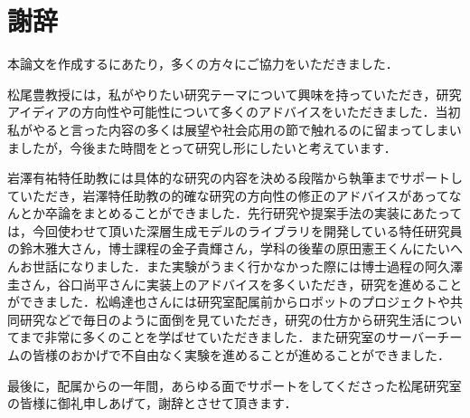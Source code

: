 \chapter*{謝辞}
\label{chap:acknowledgments}
本論文を作成するにあたり，多くの方々にご協力をいただきました．

松尾豊教授には，私がやりたい研究テーマについて興味を持っていただき，研究アイディアの方向性や可能性について多くのアドバイスをいただきました．当初私がやると言った内容の多くは展望や社会応用の節で触れるのに留まってしまいましたが，今後また時間をとって研究し形にしたいと考えています．

岩澤有祐特任助教には具体的な研究の内容を決める段階から執筆までサポートしていただき，岩澤特任助教の的確な研究の方向性の修正のアドバイスがあってなんとか卒論をまとめることができました．先行研究や提案手法の実装にあたっては，今回使わせて頂いた深層生成モデルのライブラリを開発している特任研究員の鈴木雅大さん，博士課程の金子貴輝さん，学科の後輩の原田憲王くんにたいへんお世話になりました．また実験がうまく行かなかった際には博士過程の阿久澤圭さん，谷口尚平さんに実装上のアドバイスを多くいただき，研究を進めることができました．松嶋達也さんには研究室配属前からロボットのプロジェクトや共同研究などで毎日のように面倒を見ていただき，研究の仕方から研究生活についてまで非常に多くのことを学ばせていただきました．また研究室のサーバーチームの皆様のおかげで不自由なく実験を進めることが進めることができました．

最後に，配属からの一年間，あらゆる面でサポートをしてくださった松尾研究室の皆様に御礼申しあげて，謝辞とさせて頂きます．